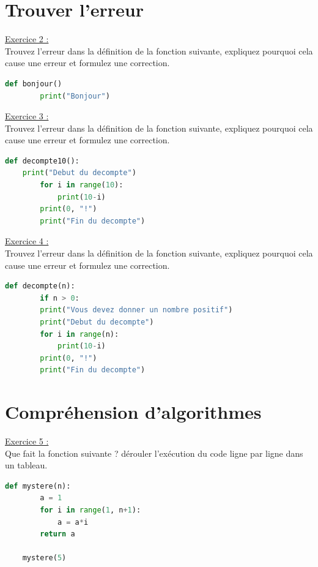 \section*{Trouver l'erreur}

\underline{Exercice 2 :}\\

Trouvez l'erreur dans la définition de la fonction suivante, expliquez pourquoi cela cause une erreur et formulez une correction.

\begin{lstlisting}[language=Python]
    def bonjour()
        print("Bonjour")
\end{lstlisting}

\underline{Exercice 3 :}\\

Trouvez l'erreur dans la définition de la fonction suivante, expliquez pourquoi cela cause une erreur et formulez une correction.

\begin{lstlisting}[language=Python]
    def decompte10():
    print("Debut du decompte")
        for i in range(10):
            print(10-i)
        print(0, "!")
        print("Fin du decompte")
\end{lstlisting}

\underline{Exercice 4 :}\\

Trouvez l'erreur dans la définition de la fonction suivante, expliquez pourquoi cela cause une erreur et formulez une correction.

\begin{lstlisting}[language=Python]
    def decompte(n):
        if n > 0:
        print("Vous devez donner un nombre positif")
        print("Debut du decompte")
        for i in range(n):
            print(10-i)
        print(0, "!")
        print("Fin du decompte")
\end{lstlisting}


\section*{Compréhension d'algorithmes}

\underline{Exercice 5 :}\\
Que fait la fonction suivante ? dérouler l'exécution du code ligne par ligne dans un tableau.
\begin{lstlisting}[language=Python]
    def mystere(n):
        a = 1
        for i in range(1, n+1):
            a = a*i
        return a

    mystere(5)
\end{lstlisting}

